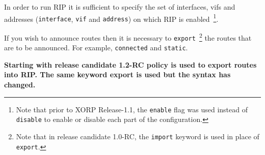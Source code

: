 In order to run RIP it is sufficient to specify the set of interfaces,
vifs and addresses ({\tt interface}, {\tt vif} and {\tt address}) on
which RIP is enabled~\footnote{Note that prior to XORP Release-1.1,
the {\tt enable} flag was used instead of {\tt disable} to enable
or disable each part of the configuration.}.

If you wish to announce routes then it is necessary to
{\tt export}~\footnote{Note that in release candidate 1.0-RC, the {\tt import}
 keyword is used in place of {\tt export}.}
the routes that are to be announced. For example, {\tt connected} and 
{\tt static}.

{\bf Starting with release candidate 1.2-RC policy is used to export
routes into RIP. The same keyword {\stt export} is used but the syntax has
changed.}

\vspace{0.1in}
